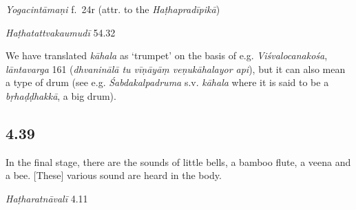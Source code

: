 \begin{ekdosis}
\begin{testimonia}[hp04_038]
\emph{Yogacintāmaṇi} f.~24r (attr. to the \emph{Haṭhapradīpikā})
\begin{versinnote}
\end{versinnote}    

\emph{Haṭhatattvakaumudī} 54.32
\begin{versinnote}
\end{versinnote}
\end{testimonia}

\begin{philcomm}[hp04_038]
We have translated \emph{kāhala} as `trumpet' on the basis of e.g. \emph{Viśvalocanakośa}, \emph{lāntavarga} 161 (\emph{dhvaninālā tu vīṇāyāṃ veṇukāhalayor api}), but it can also mean a type of drum (see e.g. \emph{Śabdakalpadruma} s.v. \emph{kāhala} where it is said to be a \emph{bṛhaḍḍhakkā}, a big drum).%
\end{philcomm}

\subsection*{4.39}
\begin{translation}[hp04_039]
In the final stage, there are the sounds of little bells, a bamboo flute, a veena and a bee. [These] various sound are heard in the body.
\end{translation}


\begin{testimonia}[hp04_039]
\emph{Haṭharatnāvalī} 4.11 
\begin{versinnote}
\end{versinnote}


\end{testimonia}
\end{ekdosis}
